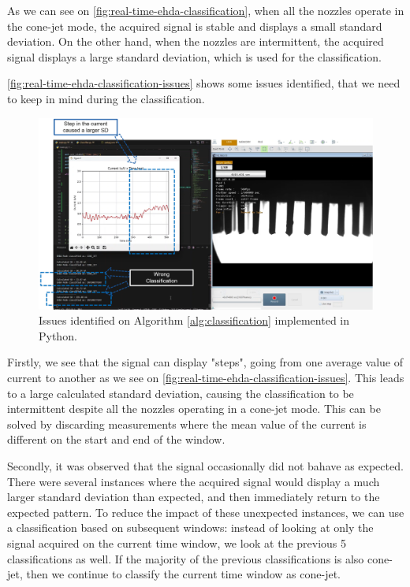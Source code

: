 \documentclass[oneside,12pt]{article}
\begin{document}
As we can see on \autoref{fig:real-time-ehda-classification}, when all the nozzles operate in
the cone-jet mode, the acquired signal is stable and displays a small standard deviation.
On the other hand, when the nozzles are intermittent, the acquired signal displays a 
large standard deviation, which is used for the classification.

\autoref{fig:real-time-ehda-classification-issues} shows some issues identified, that we need to keep 
in mind during the classification.

\begin{figure}[h!]
    \centering
    \includegraphics[width=\textwidth,trim=1 1 1 1,clip]{figures/real-time-ehda-classification-issues.png}
    \caption{Issues identified on Algorithm \ref{alg:classification} implemented in Python.}
    \label{fig:real-time-ehda-classification-issues}
\end{figure}

Firstly, we see that the signal can display "steps", going from one average value of current to another 
as we see on \autoref{fig:real-time-ehda-classification-issues}. This leads to a large calculated standard 
deviation, causing the classification to be intermittent despite all the nozzles operating in a
cone-jet mode. This can be solved by discarding measurements where the mean value of the current 
is different on the start and end of the window.

Secondly, it was observed that the signal occasionally did not bahave as expected. There were several instances 
where the acquired signal would display a much larger standard deviation than expected, and then immediately 
return to the expected pattern. To reduce the impact of these unexpected instances, we can use a classification 
based on subsequent windows: instead of looking at only the signal acquired on the current time window, 
we look at the previous 5 classifications as well. If the majority of the previous classifications is also cone-jet,
then we continue to classify the current time window as cone-jet.
\end{document}

